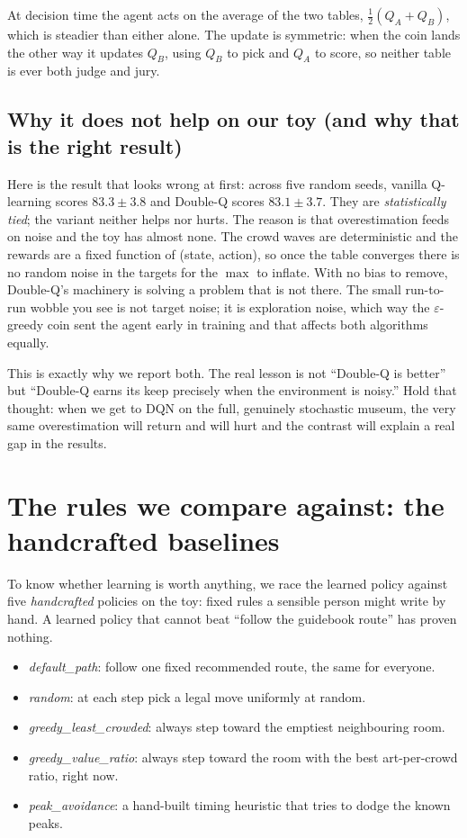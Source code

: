 \documentclass[11pt]{article}
\newcommand{\key}[1]{\textit{#1}}            %
\newcommand{\why}[1]{\textcolor{inkblue}{#1}}
\begin{document}
At decision time the agent acts on the average of the two tables, $\tfrac12(Q_A+Q_B)$, which is steadier
than either alone. The update is symmetric: when the coin lands the other way it updates $Q_B$, using
$Q_B$ to pick and $Q_A$ to score, so neither table is ever both judge and jury.

\subsection{Why it does not help on our toy (and why that is the right result)}

Here is the result that looks wrong at first: across five random seeds, vanilla Q-learning
scores $83.3 \pm 3.8$ and Double-Q scores $83.1 \pm 3.7$. They are \key{statistically
tied}; the variant neither helps nor hurts. \why{The reason is that overestimation feeds
on noise and the toy has almost none. The crowd waves are deterministic and the rewards
are a fixed function of (state, action), so once the table converges there is no random
noise in the targets for the $\max$ to inflate. With no bias to remove, Double-Q's
machinery is solving a problem that is not there.} The small run-to-run wobble you see is
not target noise; it is exploration noise, which way the $\varepsilon$-greedy coin sent
the agent early in training and that affects both algorithms equally.

This is exactly why we report both. The real lesson is not ``Double-Q is better'' but
``Double-Q earns its keep precisely when the environment is noisy.'' Hold that thought:
when we get to DQN on the full, genuinely stochastic museum, the very same overestimation
will return and will hurt and the contrast will explain a real gap in the results.

\section{The rules we compare against: the handcrafted baselines}

To know whether learning is worth anything, we race the learned policy against five
\key{handcrafted} policies on the toy: fixed rules a sensible person might write by hand.
A learned policy that cannot beat ``follow the guidebook route'' has proven nothing.

\begin{itemize}[leftmargin=1.4em,itemsep=2pt]
\item \key{default\_path}: follow one fixed recommended route, the same for everyone.
\item \key{random}: at each step pick a legal move uniformly at random.
\item \key{greedy\_least\_crowded}: always step toward the emptiest neighbouring room.
\item \key{greedy\_value\_ratio}: always step toward the room with the best art-per-crowd ratio, right now.
\item \key{peak\_avoidance}: a hand-built timing heuristic that tries to dodge the known peaks.
\end{itemize}
\end{document}
